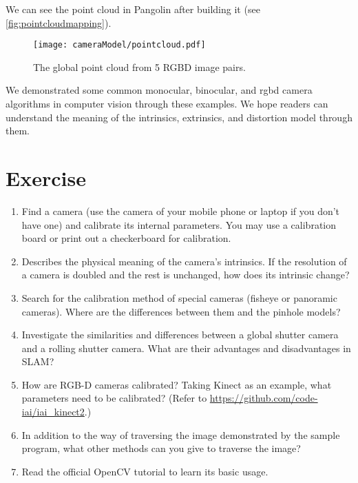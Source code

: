 We can see the point cloud in Pangolin after building it (see \autoref{fig:pointcloudmapping}). 

\begin{figure}[!t]
    \centering
    \texttt{[image: cameraModel/pointcloud.pdf]}
    \caption{The global point cloud from 5 RGBD image pairs.}
    \label{fig:pointcloudmapping}
\end{figure}

We demonstrated some common monocular, binocular, and rgbd camera algorithms in computer vision through these examples. We hope readers can understand the meaning of the intrinsics, extrinsics, and distortion model through them.

\section * {Exercise}
\begin{enumerate}
\item[\optional] Find a camera (use the camera of your mobile phone or laptop if you don't have one) and calibrate its internal parameters. You may use a calibration board or print out a checkerboard for calibration.
\item Describes the physical meaning of the camera's intrinsics. If the resolution of a camera is doubled and the rest is unchanged, how does its intrinsic change?
\item Search for the calibration method of special cameras (fisheye or panoramic cameras). Where are the differences between them and the pinhole models? 
\item Investigate the similarities and differences between a global shutter camera and a rolling shutter camera. What are their advantages and disadvantages in SLAM?
\item How are RGB-D cameras calibrated? Taking Kinect as an example, what parameters need to be calibrated? (Refer to \url{https://github.com/code-iai/iai_kinect2}.)
\item In addition to the way of traversing the image demonstrated by the sample program, what other methods can you give to traverse the image?
\item[\optional] Read the official OpenCV tutorial to learn its basic usage.
\end{enumerate}

